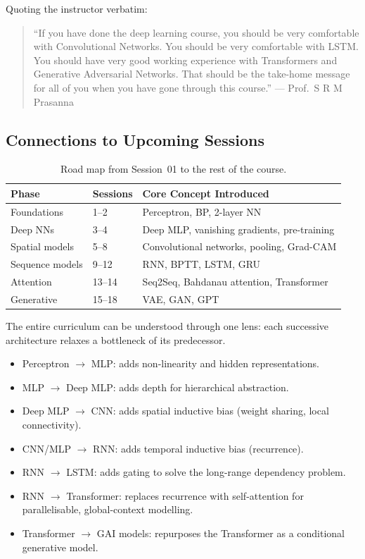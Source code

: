\documentclass[12pt,a4paper]{article}
\begin{document}
Quoting the instructor verbatim:
\begin{quote}
``If you have done the deep learning course, you should be very comfortable
with Convolutional Networks.  You should be very comfortable with LSTM.
You should have very good working experience with Transformers and Generative
Adversarial Networks.  That should be the take-home message for all of you
when you have gone through this course.''
--- Prof.\ S R M Prasanna
\end{quote}

\subsection{Connections to Upcoming Sessions}
\label{subsec:upcoming}

\begin{table}[ht]
\centering
\caption{Road map from Session~01 to the rest of the course.}
\label{tab:roadmap}
\begin{tabular}{lll}
\toprule
\textbf{Phase} & \textbf{Sessions} & \textbf{Core Concept Introduced} \\
\midrule
Foundations    & 1--2  & Perceptron, BP, 2-layer NN \\
Deep NNs       & 3--4  & Deep MLP, vanishing gradients, pre-training \\
Spatial models & 5--8  & Convolutional networks, pooling, Grad-CAM \\
Sequence models& 9--12 & RNN, BPTT, LSTM, GRU \\
Attention      & 13--14 & Seq2Seq, Bahdanau attention, Transformer \\
Generative     & 15--18 & VAE, GAN, GPT \\
\bottomrule
\end{tabular}
\end{table}

\begin{keyinsight}[title=The Big Picture]
The entire curriculum can be understood through one lens: each successive
architecture relaxes a bottleneck of its predecessor.
\begin{itemize}
  \item Perceptron $\to$ MLP: adds non-linearity and hidden representations.
  \item MLP $\to$ Deep MLP: adds depth for hierarchical abstraction.
  \item Deep MLP $\to$ CNN: adds spatial inductive bias (weight sharing,
        local connectivity).
  \item CNN/MLP $\to$ RNN: adds temporal inductive bias (recurrence).
  \item RNN $\to$ LSTM: adds gating to solve the long-range dependency problem.
  \item RNN $\to$ Transformer: replaces recurrence with self-attention for
        parallelisable, global-context modelling.
  \item Transformer $\to$ GAI models: repurposes the Transformer as a
        conditional generative model.
\end{itemize}
\end{keyinsight}
\end{document}
